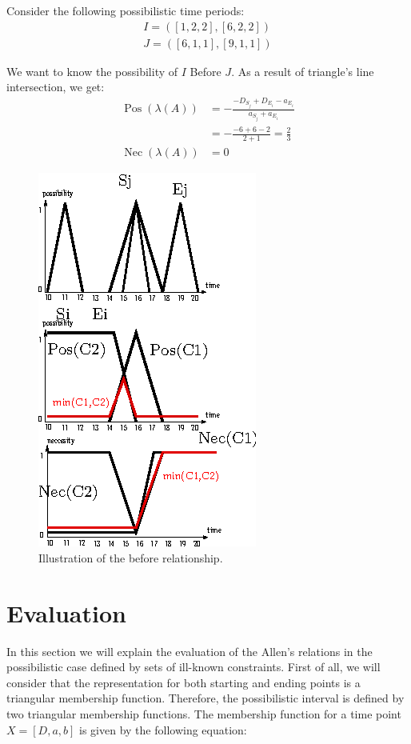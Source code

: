 \documentclass{llncs}
\newcommand{\Pos}{\operatorname{Pos}}
\newcommand{\Nec}{\operatorname{Nec}}
\begin{document}
\begin{example}
Consider the following possibilistic time periods:
\begin{align}
I = \left( \left[1,2,2 \right] , \left[6,2,2 \right] \right)\\
\nonumber
J = \left( \left[6,1,1 \right] , \left[9,1,1 \right] \right)
\end{align}

We want to know the possibility of $I$ Before $J$. As a result of triangle's line intersection, we get:
\begin{align}
 \label{sample:before}
\Pos \left(\lambda \left(A \right)\right) &= - \frac{-D_{S_j} + D_{E_i}-a_{E_i}}{a_{S_j}+a_{E_i}}\\
\nonumber
&= - \frac{-6+6-2}{2+1} = \frac{2}{3}\\
\Nec \left(\lambda \left(A\right)\right) &= 0
\end{align}


\begin{figure}[ht]
\caption{Illustration of the before relationship.}
\includegraphics[scale=2.1]{./graphs/before.eps} 
\end{figure}



\end{example}





\section{\label{sec:evaluation}Evaluation }
In this section we will explain the evaluation of the Allen's relations in the possibilistic case defined by sets of ill-known constraints.
First of all, we will consider that the representation for both starting and ending points is a triangular membership function. Therefore, the possibilistic interval is defined by two triangular membership functions.
The membership function for a time point $X = \left[D, a, b \right]$ is given by the following equation:
\end{document}
